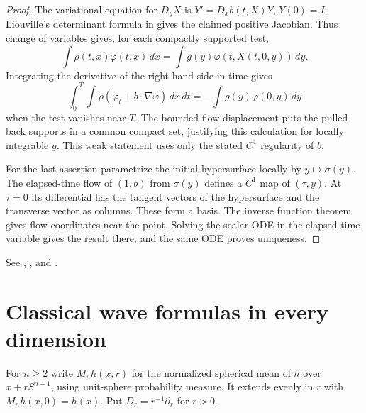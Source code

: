 \documentclass[11pt,oneside,openany]{book}
\theoremstyle{plain}
\theoremstyle{definition}
\theoremstyle{remark}
\begin{document}
\begin{proof}
The variational equation for \(D_yX\) is \(Y'=D_xb(t,X)Y\),
\(Y(0)=I\). Liouville's determinant formula in
\cite[Chapter 7]{D13} gives the claimed positive Jacobian. Thus
change of variables gives, for each compactly supported test,
\[
 \int\rho(t,x)\varphi(t,x)\,dx
     =\int g(y)\varphi(t,X(t,0,y))\,dy .
\]
Integrating the derivative of the right-hand side in time gives
\[
 \int_0^T\!\!\int \rho(\varphi_t+b\cdot\nabla\varphi)\,dx\,dt
   =-\int g(y)\varphi(0,y)\,dy
\]
when the test vanishes near \(T\). The bounded flow displacement
puts the pulled-back supports in a common compact set, justifying
this calculation for locally integrable \(g\). This weak statement
uses only the stated \(C^1\) regularity of \(b\).

For the last assertion parametrize the initial hypersurface locally
by \(y\mapsto \sigma(y)\). The elapsed-time flow of \((1,b)\)
from \(\sigma(y)\) defines a \(C^1\) map of \((\tau,y)\).
At \(\tau=0\) its differential has the tangent vectors of
the hypersurface and the transverse vector as columns. These
form a basis. The inverse function theorem gives flow coordinates
near the point. Solving the scalar ODE in the elapsed-time variable
gives the result there, and the same ODE proves uniqueness.
\end{proof}

See \cite[Sections 2.1 and 3.2]{Evans},
\cite[Chapter 2]{RR}, and \cite[Chapter 1, Section 5]{John}.

\section{Classical wave formulas in every dimension}\label{pde:W02}

For \(n\geq 2\) write \(M_n h(x,r)\) for the normalized spherical
mean of \(h\) over \(x+rS^{n-1}\), using unit-sphere probability
measure. It extends evenly in \(r\) with \(M_n h(x,0)=h(x)\).
Put \(D_r=r^{-1}\partial_r\) for \(r>0\).
\end{document}
